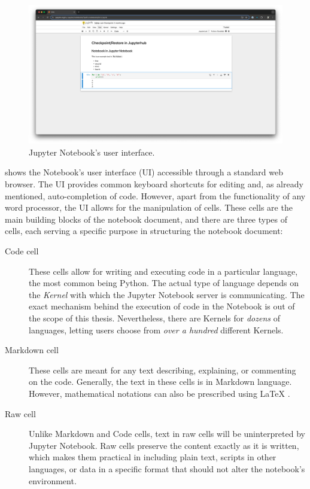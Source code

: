 \documentclass[
  digital,     %
  oneside,     %
  nosansbold,  %
  nocolorbold, %
  lof,         %
  nolot,         %
]{fithesis4}
\begin{document}
\begin{figure}[H]
  \begin{center}
  \includegraphics[width=\textwidth]{figures/jupyter-notebook-screenshot.png}
  \end{center}
  \caption{Jupyter Notebook's user interface.}
  \label{fig:jupyter-notebook-screenshot}
\end{figure}

 shows the Notebook's user interface (UI) accessible through a standard web browser. The UI provides common keyboard shortcuts for editing and, as already mentioned, auto-completion of code. However, apart from the functionality of any word processor, the UI allows for the manipulation of cells. These cells are the main building blocks of the notebook document, and there are three types of cells, each serving a specific purpose in structuring the notebook document:

\begin{description}

    \item[Code cell]
    These cells allow for writing and executing code in a particular language, the most common being Python. The actual type of language depends on the \emph{Kernel} with which the Jupyter Notebook server is communicating. The exact mechanism behind the execution of code in the Notebook is out of the scope of this thesis. Nevertheless, there are Kernels for \emph{dozens} of languages, letting users choose from \emph{over a hundred} \cite{perkel2018jupyter} different Kernels.

    \item[Markdown cell]
    These cells are meant for any text describing, explaining, or commenting on the code. Generally, the text in these cells is in Markdown language. However, mathematical notations can also be prescribed using LaTeX \cite{jupyter_notebook}. 
    
    \item[Raw cell]
    Unlike Markdown and Code cells, text in raw cells will be uninterpreted by Jupyter Notebook. Raw cells preserve the content exactly as it is written, which makes them practical in including plain text, scripts in other languages, or data in a specific format that should not alter the notebook's environment.
    
\end{description}
\end{document}
